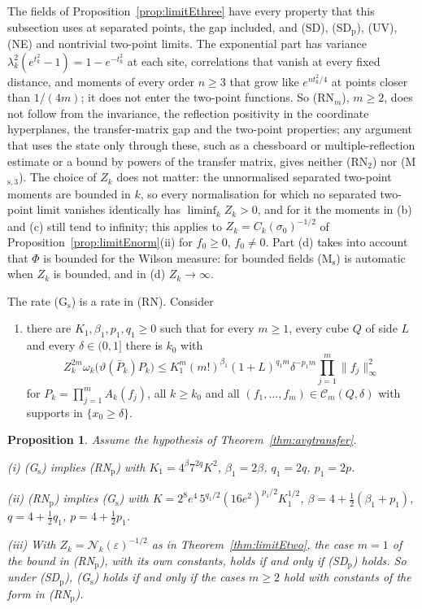 \documentclass[aps,prd,twocolumn,superscriptaddress,nofootinbib,longbibliography,floatfix,amsmath,amssymb,10pt]{revtex4-2}
\newtheorem{proposition}[theorem]{Proposition}
\theoremstyle{definition}
\theoremstyle{remark}
\begin{document}
The fields of Proposition~\ref{prop:limitEthree} have every property that
this subsection uses at separated points, the gap included, and (SD),
(SD$_{\mathrm p}$), (UV), (NE) and nontrivial two-point limits. The
exponential part has variance $\lambda_k^2(e^{t_k^2}-1)=1-e^{-t_k^2}$ at
each site, correlations that vanish at every fixed distance, and moments of
every order $n\ge3$ that grow like $e^{nt_k^2/4}$ at points closer than
$1/(4m)$; it does not enter the two-point functions. So (RN$_m$), $m\ge2$,
does not follow from the invariance, the reflection positivity in the
coordinate hyperplanes, the transfer-matrix gap and the two-point
properties; any argument that uses the state only through these, such as a
chessboard or multiple-reflection estimate or a bound by powers of the
transfer matrix, gives neither (RN$_2$) nor (M$_{\mathrm s,3}$). The
choice of $Z_k$ does not matter: the unnormalised separated two-point moments
are bounded in $k$, so every normalisation for which no separated
two-point limit vanishes identically has $\liminf_kZ_k>0$, and for it the moments in
(b) and (c) still tend to infinity; this applies to $Z_k=C_k(\sigma_0)^{-1/2}$
of Proposition~\ref{prop:limitEnorm}(ii) for $f_0\ge0$, $f_0\ne0$. Part (d)
takes into account that $\Phi$ is bounded for the Wilson measure: for
bounded fields (M$_{\mathrm s}$) is automatic when $Z_k$ is bounded, and in
(d) $Z_k\to\infty$.

The rate (G$_{\mathrm s}$) is a rate in (RN). Consider
\begin{enumerate}[label=\textup{(RN$_{\mathrm p}$)},leftmargin=*]
\item there are $K_1,\beta_1,p_1,q_1\ge0$ such that for every $m\ge1$, every
cube $Q$ of side $L$ and every $\delta\in(0,1]$ there is $k_0$ with
\[
Z_k^{2m}\omega_k\bigl(\vartheta(\bar P_k)P_k\bigr)\le K_1^m(m!)^{\beta_1}
(1+L)^{q_1m}\delta^{-p_1m}\prod_{j=1}^m\|f_j\|_\infty^2
\]
for $P_k=\prod_{j=1}^mA_k(f_j)$, all $k\ge k_0$ and all $(f_1,\dots,f_m)\in
\mathcal C_m(Q,\delta)$ with supports in $\{x_0\ge\delta\}$.
\end{enumerate}

\begin{proposition}\label{prop:limitErate}
Assume the hypothesis of Theorem~\textup{\ref{thm:avgtransfer}}.

\textup{(i)} \textup{(G$_{\mathrm s}$)} implies \textup{(RN$_{\mathrm p}$)}
with $K_1=4^\beta7^{2q}K^2$, $\beta_1=2\beta$, $q_1=2q$, $p_1=2p$.

\textup{(ii)} \textup{(RN$_{\mathrm p}$)} implies \textup{(G$_{\mathrm s}$)}
with $K=2^8e^4\,5^{q_1/2}(16e^2)^{p_1/2}K_1^{1/2}$,
$\beta=4+\frac12(\beta_1+p_1)$, $q=4+\frac12q_1$, $p=4+\frac12p_1$.

\textup{(iii)} With $Z_k=\mathcal N_k(\varepsilon)^{-1/2}$ as in
Theorem~\textup{\ref{thm:limitEtwo}}, the case $m=1$ of the bound in
\textup{(RN$_{\mathrm p}$)}, with its own constants, holds if and only if
\textup{(SD$_{\mathrm p}$)} holds. So under \textup{(SD$_{\mathrm p}$)},
\textup{(G$_{\mathrm s}$)} holds if and only if the cases $m\ge2$ hold with
constants of the form in \textup{(RN$_{\mathrm p}$)}.
\end{proposition}
\end{document}
